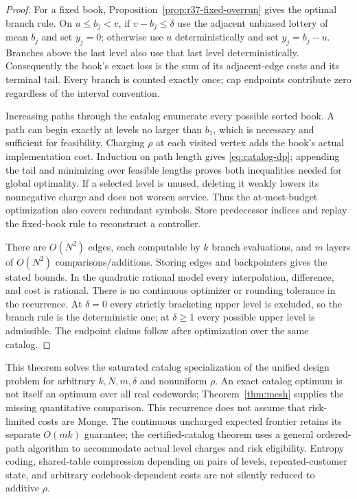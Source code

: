 \begin{proof}
For a fixed book, Proposition~\ref{prop:r37-fixed-overrun} gives the optimal branch rule. On $u\leq b_j<v$, if $v-b_j\leq\delta$ use the adjacent unbiased lottery of mean $b_j$ and set $y_j=0$; otherwise use $u$ deterministically and set $y_j=b_j-u$. Branches above the last level also use that last level deterministically. Consequently the book's exact loss is the sum of its adjacent-edge costs and its terminal tail. Every branch is counted exactly once; cap endpoints contribute zero regardless of the interval convention.

Increasing paths through the catalog enumerate every possible sorted book. A path can begin exactly at levels no larger than $b_1$, which is necessary and sufficient for feasibility. Charging $\rho$ at each visited vertex adds the book's actual implementation cost. Induction on path length gives \eqref{eq:catalog-dp}; appending the tail and minimizing over feasible lengths proves both inequalities needed for global optimality. If a selected level is unused, deleting it weakly lowers its nonnegative charge and does not worsen service. Thus the at-most-budget optimization also covers redundant symbols. Store predecessor indices and replay the fixed-book rule to reconstruct a controller.

There are $O(N^2)$ edges, each computable by $k$ branch evaluations, and $m$ layers of $O(N^2)$ comparisons/additions. Storing edges and backpointers gives the stated bounds. In the quadratic rational model every interpolation, difference, and cost is rational. There is no continuous optimizer or rounding tolerance in the recurrence. At $\delta=0$ every strictly bracketing upper level is excluded, so the branch rule is the deterministic one; at $\delta\geq1$ every possible upper level is admissible. The endpoint claims follow after optimization over the same catalog.
\end{proof}

This theorem solves the saturated catalog specialization of the unified design problem for arbitrary $k,N,m,\delta$ and nonuniform $\rho$. An exact catalog optimum is not itself an optimum over all real codewords; Theorem~\ref{thm:mesh} supplies the missing quantitative comparison. This recurrence does not assume that risk-limited costs are Monge. The continuous uncharged expected frontier retains its separate $O(mk)$ guarantee; the certified-catalog theorem uses a general ordered-path algorithm to accommodate actual level charges and risk eligibility. Entropy coding, shared-table compression depending on pairs of levels, repeated-customer state, and arbitrary codebook-dependent costs are not silently reduced to additive $\rho$.

